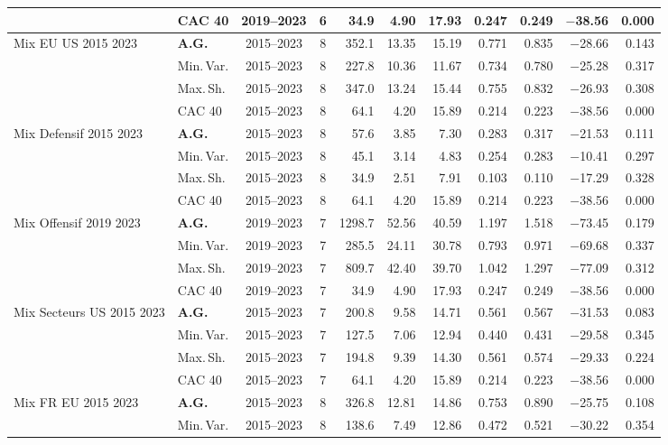 \begin{longtable}{p{2.6cm} l c c r r r r r r r}
 & CAC 40 & 2019--2023 & 6 & 34.9 & 4.90 & 17.93 & 0.247 & 0.249 & $-$38.56 & 0.000 \\
\midrule
Mix EU US 2015 2023 & \textbf{A.G.} & 2015--2023 & 8 & 352.1 & 13.35 & 15.19 & 0.771 & 0.835 & $-$28.66 & 0.143 \\
 & Min.\,Var. & 2015--2023 & 8 & 227.8 & 10.36 & 11.67 & 0.734 & 0.780 & $-$25.28 & 0.317 \\
 & Max.\,Sh. & 2015--2023 & 8 & 347.0 & 13.24 & 15.44 & 0.755 & 0.832 & $-$26.93 & 0.308 \\
 & CAC 40 & 2015--2023 & 8 & 64.1 & 4.20 & 15.89 & 0.214 & 0.223 & $-$38.56 & 0.000 \\
\midrule
Mix Defensif 2015 2023 & \textbf{A.G.} & 2015--2023 & 8 & 57.6 & 3.85 & 7.30 & 0.283 & 0.317 & $-$21.53 & 0.111 \\
 & Min.\,Var. & 2015--2023 & 8 & 45.1 & 3.14 & 4.83 & 0.254 & 0.283 & $-$10.41 & 0.297 \\
 & Max.\,Sh. & 2015--2023 & 8 & 34.9 & 2.51 & 7.91 & 0.103 & 0.110 & $-$17.29 & 0.328 \\
 & CAC 40 & 2015--2023 & 8 & 64.1 & 4.20 & 15.89 & 0.214 & 0.223 & $-$38.56 & 0.000 \\
\midrule
Mix Offensif 2019 2023 & \textbf{A.G.} & 2019--2023 & 7 & 1298.7 & 52.56 & 40.59 & 1.197 & 1.518 & $-$73.45 & 0.179 \\
 & Min.\,Var. & 2019--2023 & 7 & 285.5 & 24.11 & 30.78 & 0.793 & 0.971 & $-$69.68 & 0.337 \\
 & Max.\,Sh. & 2019--2023 & 7 & 809.7 & 42.40 & 39.70 & 1.042 & 1.297 & $-$77.09 & 0.312 \\
 & CAC 40 & 2019--2023 & 7 & 34.9 & 4.90 & 17.93 & 0.247 & 0.249 & $-$38.56 & 0.000 \\
\midrule
Mix Secteurs US 2015 2023 & \textbf{A.G.} & 2015--2023 & 7 & 200.8 & 9.58 & 14.71 & 0.561 & 0.567 & $-$31.53 & 0.083 \\
 & Min.\,Var. & 2015--2023 & 7 & 127.5 & 7.06 & 12.94 & 0.440 & 0.431 & $-$29.58 & 0.345 \\
 & Max.\,Sh. & 2015--2023 & 7 & 194.8 & 9.39 & 14.30 & 0.561 & 0.574 & $-$29.33 & 0.224 \\
 & CAC 40 & 2015--2023 & 7 & 64.1 & 4.20 & 15.89 & 0.214 & 0.223 & $-$38.56 & 0.000 \\
\midrule
Mix FR EU 2015 2023 & \textbf{A.G.} & 2015--2023 & 8 & 326.8 & 12.81 & 14.86 & 0.753 & 0.890 & $-$25.75 & 0.108 \\
 & Min.\,Var. & 2015--2023 & 8 & 138.6 & 7.49 & 12.86 & 0.472 & 0.521 & $-$30.22 & 0.354 \\

\end{longtable}
